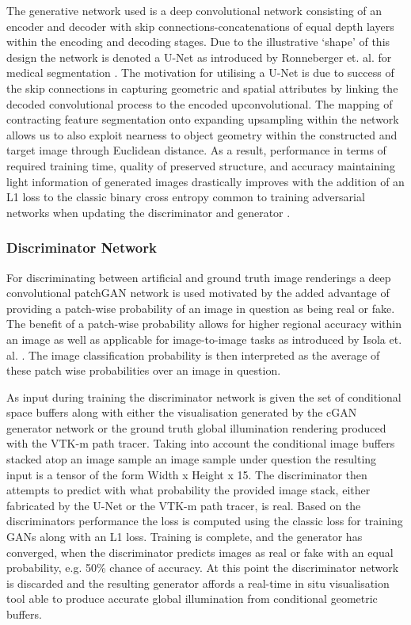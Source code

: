 The generative network used is a deep convolutional network consisting of an encoder and decoder with skip connections-concatenations of equal depth layers within the encoding and decoding stages. Due to the illustrative `shape' of this design the network is denoted a U-Net as introduced by Ronneberger et. al. for medical segmentation \cite{ronnebergerUnet}. The motivation for utilising a U-Net is due to success of the skip connections in capturing geometric and spatial attributes by linking the decoded convolutional process to the encoded upconvolutional. The mapping of contracting feature segmentation onto expanding upsampling within the network allows us to also exploit nearness to object geometry within the constructed and target image through Euclidean distance. As a result, performance in terms of required training time, quality of preserved structure, and accuracy maintaining light information of generated images drastically improves with the addition of an L1 loss to the classic binary cross entropy common to training adversarial networks when updating the discriminator and generator  \cite{isolaL1}\cite{NIPS2014_5423}. 

\subsubsection{Discriminator Network}

For discriminating between artificial and ground truth image renderings a deep convolutional patchGAN network is used motivated by the added advantage of providing a patch-wise probability of an image in question as being real or fake. The benefit of a patch-wise probability allows for higher regional accuracy within an image as well as applicable for image-to-image tasks as introduced by Isola et. al. \cite{isolaPatch}. The image classification probability is then interpreted as the average of these patch wise probabilities over an image in question. 

As input during training the discriminator network is given the set of conditional space buffers along with either the visualisation generated by the cGAN generator network or the ground truth global illumination rendering produced with the VTK-m path tracer. Taking into account the conditional image buffers stacked atop an image sample an image sample under question the resulting input is a tensor of the form Width x Height x 15. The discriminator then attempts to predict with what probability the provided image stack, either fabricated by the U-Net or the VTK-m path tracer, is real. Based on the discriminators performance the loss is computed using the classic loss for training GANs along with an L1 loss. Training is complete, and the generator has converged, when the discriminator predicts images as real or fake with an equal probability, e.g. 50\% chance of accuracy. At this point the discriminator network is discarded and the resulting generator affords a real-time in situ visualisation tool able to produce accurate global illumination from conditional geometric buffers.

